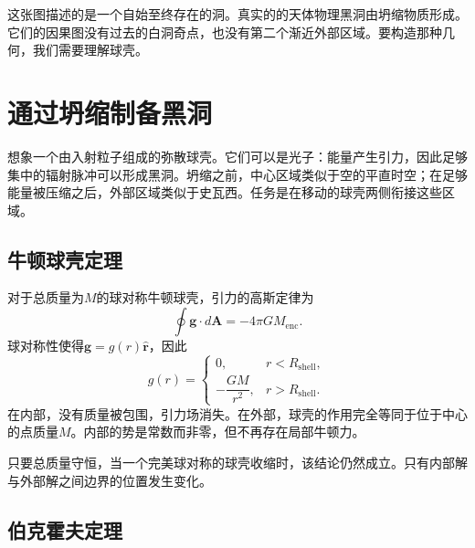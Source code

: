\begin{classroomqa}
\end{classroomqa}

这张图描述的是一个自始至终存在的洞。真实的的天体物理黑洞由坍缩物质形成。它们的因果图没有过去的白洞奇点，也没有第二个渐近外部区域。要构造那种几何，我们需要理解球壳。

\section{通过坍缩制备黑洞}

想象一个由入射粒子组成的弥散球壳。它们可以是光子：能量产生引力，因此足够集中的辐射脉冲可以形成黑洞。坍缩之前，中心区域类似于空的平直时空；在足够能量被压缩之后，外部区域类似于史瓦西。任务是在移动的球壳两侧衔接这些区域。

\subsection{牛顿球壳定理}

对于总质量为\(M\)的球对称牛顿球壳，引力的高斯定律为
\begin{equation}
\oint \mathbf{g}\cdot d\mathbf{A}=-4\pi G M_{\mathrm{enc}}.
\label{eq:l04-gauss-gravity}
\end{equation}
球对称性使得\(\mathbf{g}=g(r)\hat{\mathbf r}\)，因此
\begin{equation}
g(r)=
\begin{cases}
0, & r<R_{\mathrm{shell}},\\[4pt]
-\dfrac{GM}{r^2}, & r>R_{\mathrm{shell}}.
\end{cases}
\label{eq:l04-shell-field}
\end{equation}
在内部，没有质量被包围，引力场消失。在外部，球壳的作用完全等同于位于中心的点质量\(M\)。内部的势是常数而非零，但不再存在局部牛顿力。

只要总质量守恒，当一个完美球对称的球壳收缩时，该结论仍然成立。只有内部解与外部解之间边界的位置发生变化。

\subsection{伯克霍夫定理}

